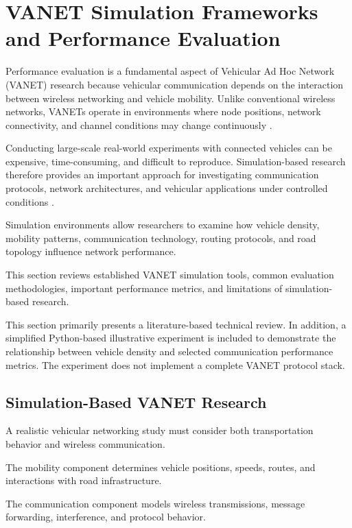 
\section{VANET Simulation Frameworks and Performance Evaluation}
\label{sec:4}

Performance evaluation is a fundamental aspect of
Vehicular Ad Hoc Network (VANET) research because
vehicular communication depends on the interaction
between wireless networking and vehicle mobility.
Unlike conventional wireless networks, VANETs
operate in environments where node positions,
network connectivity, and channel conditions
may change continuously \cite{Hartenstein2008}.

Conducting large-scale real-world experiments
with connected vehicles can be expensive,
time-consuming, and difficult to reproduce.
Simulation-based research therefore provides
an important approach for investigating
communication protocols, network architectures,
and vehicular applications under controlled
conditions \cite{Sommer2011}.

Simulation environments allow researchers
to examine how vehicle density, mobility
patterns, communication technology, routing
protocols, and road topology influence
network performance.

This section reviews established VANET
simulation tools, common evaluation
methodologies, important performance
metrics, and limitations of
simulation-based research.

 This section primarily presents a
literature-based technical review.
In addition, a simplified Python-based
illustrative experiment is included
to demonstrate the relationship between
vehicle density and selected
communication performance metrics.
The experiment does not implement
a complete VANET protocol stack.

\subsection{Simulation-Based VANET Research}
\label{sec:4A}

A realistic vehicular networking study
must consider both transportation
behavior and wireless communication.

The mobility component determines
vehicle positions, speeds, routes,
and interactions with road
infrastructure.

The communication component models
wireless transmissions, message
forwarding, interference, and
protocol behavior.

